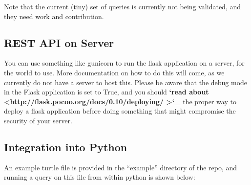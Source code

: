 \documentclass[letterpaper,10pt,english]{sphinxmanual}
\begin{document}
Note that the current (tiny) set of queries is currently not being validated, and they need work and contribution.


\subsection{REST API on Server}
\label{getting-started:rest-api-on-server}
You can use something like gunicorn to run the flask application on a server, for the world to use. More documentation on how to do this will come, as we currently do not have a server to host this. Please be aware that the debug mode in the Flask application is set to True, and you should {\color{red}\bfseries{}{}`read about \textless{}http://flask.pocoo.org/docs/0.10/deploying/
\textgreater{}{}`\_} the proper way to deploy a flask application before doing something that might compromise the security of your server.


\subsection{Integration into Python}
\label{getting-started:integration-into-python}
An example turtle file is provided in the ``example'' directory of the repo, and running a query on this file from within python is shown below:
\end{document}
